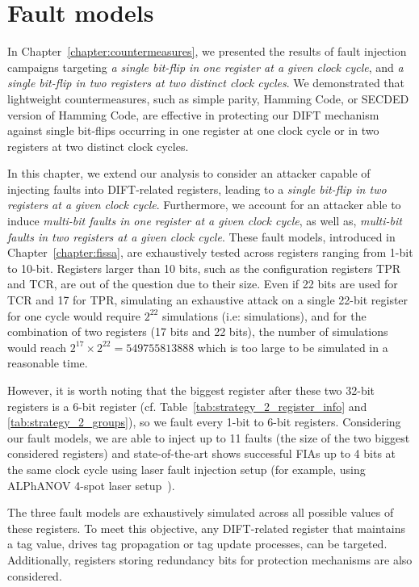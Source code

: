 \section{Fault models}
\label{section:chap6_faultmodels}
In Chapter~\ref{chapter:countermeasures}, we presented the results of fault injection campaigns targeting \textit{a single bit-flip in one register at a given clock cycle}, and \textit{a single bit-flip in two registers at two distinct clock cycles}. We demonstrated that lightweight countermeasures, such as simple parity, Hamming Code, or SECDED version of Hamming Code, are effective in protecting our DIFT mechanism against single bit-flips occurring in one register at one clock cycle or in two registers at two distinct clock cycles.

In this chapter, we extend our analysis to consider an attacker capable of injecting faults into DIFT-related registers, leading to a \textit{single bit-flip in two registers at a given clock cycle}. Furthermore, we account for an attacker able to induce \textit{multi-bit faults in one register at a given clock cycle}, as well as, \textit{multi-bit faults in two registers at a given clock cycle}. These fault models, introduced in Chapter~\ref{chapter:fissa}, are exhaustively tested across registers ranging from 1-bit to 10-bit. Registers larger than 10 bits, such as the configuration registers TPR and TCR, are out of the question due to their size. Even if 22 bits are used for TCR and 17 for TPR, simulating an exhaustive attack on a single 22-bit register for one cycle would require $2^{22}$ simulations (i.e:  simulations), and for the combination of two registers (17 bits and 22 bits), the number of simulations would reach $2^{17} \times 2^{22} = \num{549755813888}$ which is too large to be simulated in a reasonable time.

However, it is worth noting that the biggest register after these two 32-bit registers is a 6-bit register (cf. Table~\ref{tab:strategy_2_register_info} and \ref{tab:strategy_2_groups}), so we fault every 1-bit to 6-bit registers. Considering our fault models, we are able to inject up to 11 faults (the size of the two biggest considered registers) and state-of-the-art shows successful FIAs up to 4 bits at the same clock cycle using laser fault injection setup (for example, using ALPhANOV 4-spot laser setup~\cite{alphanov-fourLFI}).

The three fault models are exhaustively simulated across all possible values of these registers. To meet this objective, any DIFT-related register that maintains a tag value, drives tag propagation or tag update processes, can be targeted. Additionally, registers storing redundancy bits for protection mechanisms are also considered.

